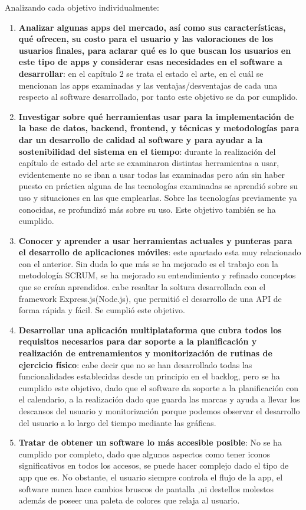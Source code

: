 Analizando cada objetivo individualmente:
\begin{enumerate}
	\item \textbf{Analizar algunas apps del mercado, así como sus características, qué ofrecen, su costo para el usuario y las valoraciones de los usuarios finales, para aclarar qué es lo que buscan los usuarios en este tipo de apps y considerar esas necesidades en el software a desarrollar}: en el capítulo 2 se trata el estado el arte, en el cuál se mencionan las apps examinadas y las ventajas/desventajas de cada una respecto al software desarrollado, por tanto este objetivo se da por cumplido.
	\item \textbf{Investigar sobre qué herramientas usar para la implementación de la base de datos, backend, frontend, y técnicas y metodologías para dar un desarrollo de calidad al software y para ayudar a la sostenibilidad del sistema en el tiempo}: durante la realización del capítulo de estado del arte se examinaron distintas herramientas a usar, evidentemente no se iban a usar todas las examinadas pero aún sin haber puesto en práctica alguna de las tecnologías examinadas se aprendió sobre su uso y situaciones en las que emplearlas. Sobre las tecnologías previamente ya conocidas, se profundizó más sobre su uso. Este objetivo también se ha cumplido.
	\item \textbf{Conocer y aprender a usar herramientas actuales y punteras para el desarrollo de aplicaciones móviles}: este apartado esta muy relacionado con el anterior. Sin duda lo que más se ha mejorado es el trabajo con la metodología SCRUM, se ha mejorado su entendimiento y refinado conceptos que se creían aprendidos. cabe resaltar la soltura desarrollada con el framework Express.js(Node.js), que permitió el desarrollo de una API de forma rápida y fácil. Se cumplió este objetivo.
	\item \textbf{Desarrollar una aplicación multiplataforma que cubra todos los requisitos necesarios para dar soporte a la planificación y realización de entrenamientos y monitorización de rutinas de ejercicio físico}: cabe decir que no se han desarrollado todas las funcionalidades establecidas desde un principio en el backlog, pero se ha cumplido este objetivo, dado que el software da soporte a la planificación con el calendario, a la realización dado que guarda las marcas y ayuda a llevar los descansos del usuario y monitorización porque podemos observar el desarrollo del usuario a lo largo del tiempo mediante las gráficas.
	\item \textbf{Tratar de obtener un software lo más accesible posible}: No se ha cumplido por completo, dado que algunos aspectos como tener iconos significativos en todos los accesos, se puede hacer complejo dado el tipo de app que es. No obstante, el usuario siempre controla el flujo de la app, el software nunca hace cambios bruscos de pantalla ,ni destellos molestos además de poseer una paleta de colores que relaja al usuario.
\end{enumerate}

